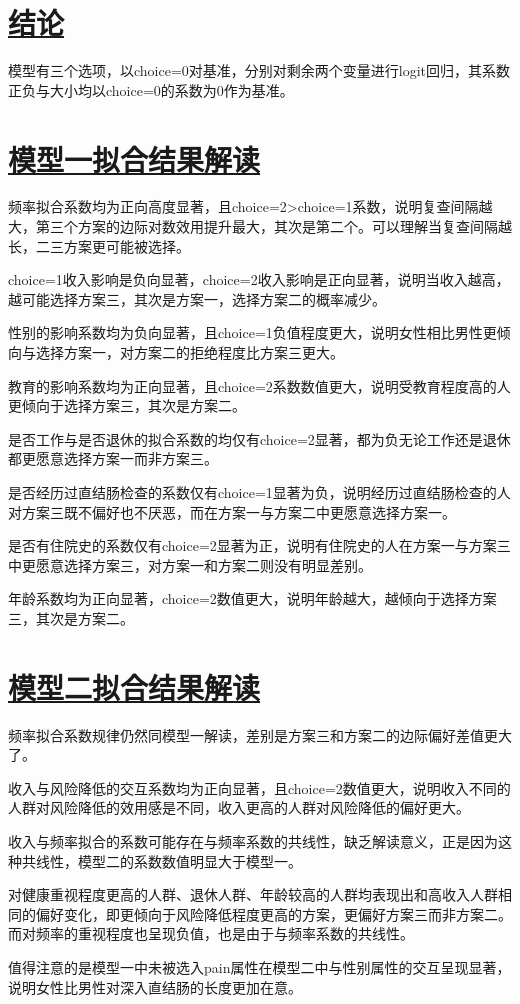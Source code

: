 \documentclass[10pt, conference, compsocconf]{IEEEtran}
\begin{document}
\begin{CJK}{UTF8}{gbsn}
\vspace{0.5cm}

\section{\underline{结论}}
模型有三个选项，以choice=0对基准，分别对剩余两个变量进行logit回归，其系数正负与大小均以choice=0的系数为0作为基准。
\section{\underline{模型一拟合结果解读}}
频率拟合系数均为正向高度显著，且choice=2>choice=1系数，说明复查间隔越大，第三个方案的边际对数效用提升最大，其次是第二个。可以理解当复查间隔越长，二三方案更可能被选择。

choice=1收入影响是负向显著，choice=2收入影响是正向显著，说明当收入越高，越可能选择方案三，其次是方案一，选择方案二的概率减少。

性别的影响系数均为负向显著，且choice=1负值程度更大，说明女性相比男性更倾向与选择方案一，对方案二的拒绝程度比方案三更大。

教育的影响系数均为正向显著，且choice=2系数数值更大，说明受教育程度高的人更倾向于选择方案三，其次是方案二。

是否工作与是否退休的拟合系数的均仅有choice=2显著，都为负无论工作还是退休都更愿意选择方案一而非方案三。

是否经历过直结肠检查的系数仅有choice=1显著为负，说明经历过直结肠检查的人对方案三既不偏好也不厌恶，而在方案一与方案二中更愿意选择方案一。

是否有住院史的系数仅有choice=2显著为正，说明有住院史的人在方案一与方案三中更愿意选择方案三，对方案一和方案二则没有明显差别。

年龄系数均为正向显著，choice=2数值更大，说明年龄越大，越倾向于选择方案三，其次是方案二。

\section{\underline{模型二拟合结果解读}}
频率拟合系数规律仍然同模型一解读，差别是方案三和方案二的边际偏好差值更大了。

收入与风险降低的交互系数均为正向显著，且choice=2数值更大，说明收入不同的人群对风险降低的效用感是不同，收入更高的人群对风险降低的偏好更大。

收入与频率拟合的系数可能存在与频率系数的共线性，缺乏解读意义，正是因为这种共线性，模型二的系数数值明显大于模型一。

对健康重视程度更高的人群、退休人群、年龄较高的人群均表现出和高收入人群相同的偏好变化，即更倾向于风险降低程度更高的方案，更偏好方案三而非方案二。而对频率的重视程度也呈现负值，也是由于与频率系数的共线性。

值得注意的是模型一中未被选入pain属性在模型二中与性别属性的交互呈现显著，说明女性比男性对深入直结肠的长度更加在意。

\printbibliography
\end{CJK}
\end{document}
